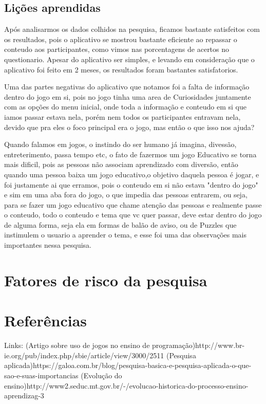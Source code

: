 \documentclass[12pt]{article}
\begin{document}
	\subsection{Lições aprendidas}
		Após analisarmos os dados colhidos na pesquisa, ficamos bastante satisfeitos com os resultados, pois o aplicativo se mostrou bastante eficiente ao repassar o conteudo aos participantes, como vimos nas porcentagens de acertos no questionario. Apesar do aplicativo ser simples, e levando em consideração que o aplicativo foi feito em 2 meses, os resultados foram bastantes satisfatorios.
		
		Uma das partes negativas do aplicativo que notamos foi a falta de informação dentro do jogo em si, pois no jogo tinha uma area de Curiosidades juntamente com as opções do menu inicial, onde toda a informação e conteudo em si que iamos passar estava nela, porém nem todos os participantes entravam nela, devido que pra eles o foco principal era o jogo, mas então o que isso nos ajuda?
		
		Quando falamos em jogos, o instindo do ser humano já imagina, divessão, entreterimento, passa tempo etc, o fato de fazermos um jogo Educativo se torna mais dificil, pois as pessoas não associam aprendizado com diversão, então quando uma pessoa baixa um jogo educativo,o objetivo daquela pessoa é jogar, e foi justamente ai que erramos, pois o conteudo em si não estava "dentro do jogo" e sim em uma aba fora do jogo, o que impedia das pessoas entrarem, ou seja, para se fazer um jogo educativo que chame atenção das pessoas e realmente passe o conteudo, todo o conteudo e tema que vc quer passar, deve estar dentro do jogo de alguma forma, seja ela em formas de balão de aviso, ou de Puzzles que instimulem o usuario a aprender o tema, e esse foi uma das observações mais importantes nessa pesquisa.
	

	\section{Fatores de risco da pesquisa}
	
	\section{Referências} 
	
	Links: 	(Artigo sobre uso de jogos no ensino de programação)http://www.br-ie.org/pub/index.php/sbie/article/view/3000/2511
			(Pesquisa aplicada)https://galoa.com.br/blog/pesquisa-basica-e-pesquisa-aplicada-o-que-sao-e-suas-importancias
			(Evolução do ensino)http://www2.seduc.mt.gov.br/-/evolucao-historica-do-processo-ensino-aprendizag-3
	
	
	
\end{document}
